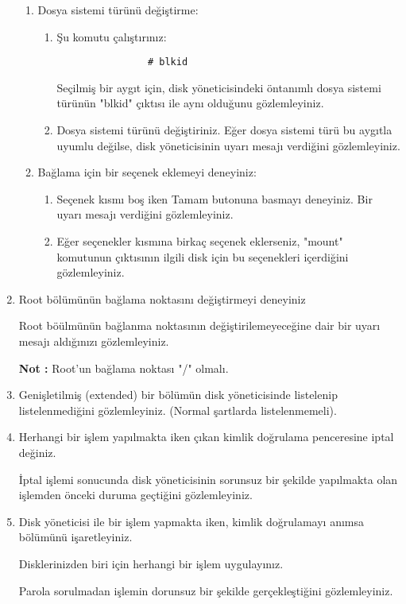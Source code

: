 \documentclass[a4paper,10pt]{article}
\begin{document}
\begin{enumerate}
\begin{enumerate}
    \item Dosya sistemi türünü değiştirme:
        \begin{enumerate}
            \item Şu komutu çalıştırınız:
            \begin{verbatim}
                # blkid
            \end{verbatim}
                  Seçilmiş bir aygıt için, disk yöneticisindeki öntanımlı dosya sistemi türünün "blkid" çıktısı ile aynı olduğunu gözlemleyiniz.
            \item Dosya sistemi türünü değiştiriniz.
                  Eğer dosya sistemi türü bu aygıtla uyumlu değilse, disk yöneticisinin uyarı mesajı verdiğini gözlemleyiniz.
        \end{enumerate}

    \item Bağlama için bir seçenek eklemeyi deneyiniz:
        \begin{enumerate}
          \item Seçenek kısmı boş iken Tamam butonuna basmayı deneyiniz.
                Bir uyarı mesajı verdiğini gözlemleyiniz.
          \item Eğer seçenekler kısmına birkaç seçenek eklerseniz,
                "mount" komutunun çıktısının ilgili disk için bu seçenekleri içerdiğini gözlemleyiniz.
        \end{enumerate}
    \end{enumerate}

\item Root bölümünün bağlama noktasını değiştirmeyi deneyiniz

      Root böülmünün bağlanma noktasının değiştirilemeyeceğine dair bir uyarı mesajı aldığınızı gözlemleyiniz.

        \textbf{Not :} Root'un bağlama noktası "/" olmalı.

\item Genişletilmiş (extended) bir bölümün disk yöneticisinde listelenip listelenmediğini gözlemleyiniz. (Normal şartlarda listelenmemeli).

\item Herhangi bir işlem yapılmakta iken çıkan kimlik doğrulama penceresine iptal değiniz.

İptal işlemi sonucunda disk yöneticisinin sorunsuz bir şekilde yapılmakta olan işlemden önceki duruma geçtiğini gözlemleyiniz.

\item Disk yöneticisi ile bir işlem yapmakta iken, kimlik doğrulamayı anımsa bölümünü işaretleyiniz.

Disklerinizden biri için herhangi bir işlem uygulayınız.

Parola sorulmadan işlemin dorunsuz bir şekilde gerçekleştiğini gözlemleyiniz.
\end{enumerate}
\end{document}
